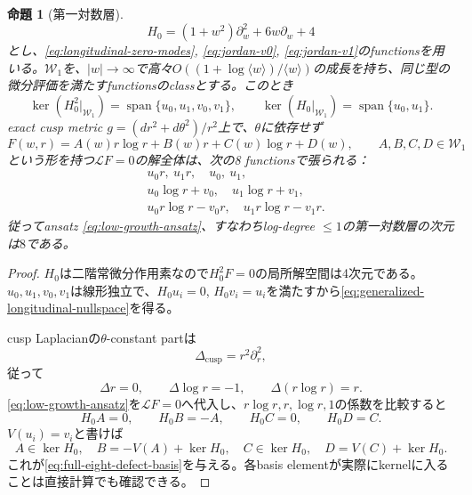 \documentclass[11pt,a4paper]{ltjsarticle}
\newtheorem{proposition}[theorem]{命題}
\theoremstyle{definition}
\theoremstyle{remark}
\begin{document}
\begin{proposition}[第一対数層]\label{prop:cusp-defect-block}
\[
 H_0=(1+w^2)\partial_w^2+6w\partial_w+4
\]
とし、\eqref{eq:longitudinal-zero-modes}, \eqref{eq:jordan-v0}, \eqref{eq:jordan-v1}のfunctionsを用いる。$\mathscr W_1$を、$|w|\to\infty$で高々$O((1+\log\langle w\rangle)/\langle w\rangle)$の成長を持ち、同じ型の微分評価を満たすfunctionsのclassとする。このとき
\begin{equation}\label{eq:generalized-longitudinal-nullspace}
 \ker(H_0^2|_{\mathscr W_1})
 =\operatorname{span}\{u_0,u_1,v_0,v_1\},
 \qquad
 \ker(H_0|_{\mathscr W_1})
 =\operatorname{span}\{u_0,u_1\}.
\end{equation}
exact cusp metric
$g=(dr^2+d\theta^2)/r^2$上で、$\theta$に依存せず
\begin{equation}\label{eq:low-growth-ansatz}
 F(w,r)=A(w)r\log r+B(w)r+C(w)\log r+D(w),
 \qquad A,B,C,D\in\mathscr W_1
\end{equation}
という形を持つ$\mathscr L F=0$の解全体は、次の8 functionsで張られる：
\begin{equation}\label{eq:full-eight-defect-basis}
 \begin{aligned}
 &u_0r,\ u_1r,\quad u_0,\ u_1,\\
 &u_0\log r+v_0,\quad u_1\log r+v_1,\\
 &u_0r\log r-v_0r,\quad
 u_1r\log r-v_1r.
 \end{aligned}
\end{equation}
従ってansatz \eqref{eq:low-growth-ansatz}、すなわちlog-degree $\le1$の第一対数層の次元は$8$である。
\end{proposition}

\begin{proof}
$H_0$は二階常微分作用素なので$H_0^2F=0$の局所解空間は4次元である。$u_0,u_1,v_0,v_1$は線形独立で、$H_0u_i=0$, $H_0v_i=u_i$を満たすから\eqref{eq:generalized-longitudinal-nullspace}を得る。

cusp Laplacianの$\theta$-constant partは
\[
 \Delta_{\mathrm{cusp}}=r^2\partial_r^2,
\]
従って
\[
 \Delta r=0,\qquad
 \Delta\log r=-1,\qquad
 \Delta(r\log r)=r.
\]
\eqref{eq:low-growth-ansatz}を$\mathscr LF=0$へ代入し、$r\log r,r,\log r,1$の係数を比較すると
\begin{equation}\label{eq:defect-coefficient-system}
 H_0A=0,\qquad
 H_0B=-A,\qquad
 H_0C=0,\qquad
 H_0D=C.
\end{equation}
$V(u_i)=v_i$と書けば
\[
 A\in\ker H_0,\quad
 B=-V(A)+\ker H_0,\quad
 C\in\ker H_0,\quad
 D=V(C)+\ker H_0.
\]
これが\eqref{eq:full-eight-defect-basis}を与える。各basis elementが実際にkernelに入ることは直接計算でも確認できる。
\end{proof}
\end{document}
